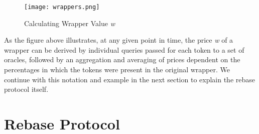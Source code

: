 \documentclass[12pt]{article}
\begin{document}
    \begin{figure}[!htb]
        \centering
        \texttt{[image: wrappers.png]}
        \caption{Calculating Wrapper Value \emph{w}}
        \label{fig:my_label}
    \end{figure}    
    
    As the figure above illustrates, at any given point in time, the price \emph{w} of a wrapper can be derived by individual queries passed for each token to a set of oracles, followed by an aggregation and averaging of prices dependent on the percentages in which the tokens were present in the original wrapper. We continue with this notation and example in the next section to explain the rebase protocol itself.
    
    \par
    

\section{Rebase Protocol}
    
\end{document}
